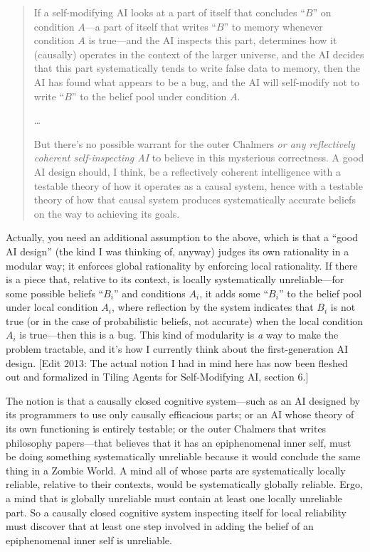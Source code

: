 \begin{quotation}

{
 If a self-modifying AI looks at a part of itself that concludes
``$B$'' on condition $A$---a part of
itself that writes ``$B$'' to memory
whenever condition $A$ is true---and the AI inspects this part,
determines how it (causally) operates in the context of the larger
universe, and the AI decides that this part systematically tends to
write false data to memory, then the AI has found what appears to be a
bug, and the AI will self-modify not to write
``$B$'' to the belief pool under
condition $A$.}

{
 \ldots}

{
 But there's no possible warrant for the outer
Chalmers \textit{or any reflectively coherent self-inspecting AI} to
believe in this mysterious correctness. A good AI design should, I
think, be a reflectively coherent intelligence with a testable theory
of how it operates as a causal system, hence with a testable theory of
how that causal system produces systematically accurate beliefs on the
way to achieving its goals.}

\end{quotation}

{
 Actually, you need an additional assumption to the above, which is
that a ``good AI design'' (the kind
I was thinking of, anyway) judges its own rationality in a modular way;
it enforces global rationality by enforcing local rationality. If there
is a piece that, relative to its context, is locally systematically
unreliable---for some possible beliefs
``$B_{i}$'' and
conditions $A_{i}$, it adds some
``$B_{i}$'' to the belief
pool under local condition $A_{i}$, where reflection by the
system indicates that $B_{i}$ is not true (or in the case of
probabilistic beliefs, not accurate) when the local condition
$A_{i}$ is true---then this is a bug. This kind of
modularity is \textit{a} way to make the problem tractable, and
it's how I currently think about the first-generation
AI design. [Edit 2013: The actual notion I had in mind here has now
been fleshed out and formalized in Tiling Agents for Self-Modifying AI,
section 6.]}

{
 The notion is that a causally closed cognitive system---such as an
AI designed by its programmers to use only causally efficacious parts;
or an AI whose theory of its own functioning is entirely testable; or
the outer Chalmers that writes philosophy papers---that believes that
it has an epiphenomenal inner self, must be doing something
systematically unreliable because it would conclude the same thing in a
Zombie World. A mind all of whose parts are systematically locally
reliable, relative to their contexts, would be systematically globally
reliable. Ergo, a mind that is globally unreliable must contain at
least one locally unreliable part. So a causally closed cognitive
system inspecting itself for local reliability must discover that at
least one step involved in adding the belief of an epiphenomenal inner
self is unreliable.}

